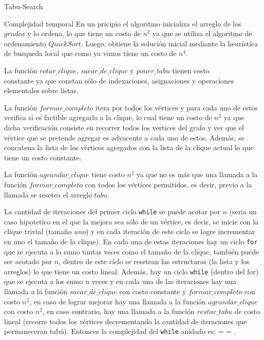 \begin{section}{Tabu-Search}
	\begin{subsection}{Complejidad temporal}
			En un pricipio el algoritmo inicializa el arreglo de los $grados$ y lo ordena, lo que tiene un costo de $n^2$ ya que se utiliza el algoritmo de ordenamiento $QuickSort$. Luego, obtiene la solución inicial mediante la heurística de busqueda local que como ya vimos tiene un costo de $n^4$.

			La función $rotar\_clique$, $sacar\_de\_clique$ y $poner\_tabu$ tienen costo\\ constante ya que constan sólo de indexaciones, asignaciones y operaciones elementales sobre listas.

			La función $formar\_completo$ itera por todos los vértices y para cada uno de estos verifica si es factible agregarlo a la clique, lo cual tiene un costo de $n^2$ ya que dicha verificación consiste en recorrer todos los vertices del grafo y ver que el vértice que se pretende agregar es adyacente a cada uno de estos. Además, se concatena la lista de los vértices agregados con la lista de la clique actual lo que tiene un costo constante.

			La función $agrandar\_clique$ tiene costo $n^2$ ya que no es más que una llamada a la función $formar\_completo$ con todos los vértices permitidos, es decir, previo a la llamada se resetea el arreglo $tabu$.

			 La cantidad de iteraciones del primer ciclo \texttt{while} se puede acotar por $n$ (seria un caso hipotetico en el que la mejora sea sólo de un vértice, es decir, se inicie con la clique trivial (tamaño $uno$) y en cada iteración de este ciclo se logre incrementar en uno el tamaño de la clique). En cada una de estas iteraciones hay un ciclo \texttt{for} que se ejecuta a lo sumo tantas veces como el tamaño de la clique, también puede ser acotado por $n$, dentro de este ciclo se resetean las estructuras (la lista y los arreglos) lo que tiene un costo lineal. Además, hay un ciclo \texttt{while} (dentro del for) que se ejecuta a los sumo $n$ veces y en cada una de las iteraciones hay una llamada a la función $sacar\_de\_clique$ con costo constante y $formar\_completo$ con costo $n^2$, en caso de lograr mejorar hay una llamada a la función $agrandar\_clique$ con costo $n^2$, en caso contrario, hay una llamada a la función $restar\_tabu$ de costo lineal (recorre todos los vértices decrementando la cantidad de iteraciones que permaneceran tabú). Entonces la complejidad del \texttt{while} anidado es:   =  = .


\end{subsection}
\end{section}
